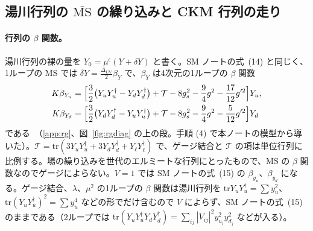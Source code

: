 \documentclass[a4paper,10pt]{ltjsarticle}
\newcommand{\MSbar}{\overline{\mathrm{MS}}}
\newcommand{\DUV}{\Delta_{\mathrm{UV}}}
\newcommand{\tr}{\mathrm{tr}}
\begin{document}
\subsection{湯川行列の $\MSbar$ の繰り込みと CKM 行列の走り}\label{sec:rg}

\paragraph{行列の $\beta$ 関数。}湯川行列の裸の量を $Y_0=\mu^\epsilon(Y+\delta Y)$ と書く。SM ノートの式~(14) と同じく、1ループの $\MSbar$ では $\delta Y=\frac{\DUV}2\beta_Y$ で、$\beta_Y$ は4次元の1ループの $\beta$ 関数
\begin{equation}
\begin{aligned}
K\beta_{Y_u}&=\Bigl[\frac32\bigl(Y_uY_u^\dagger-Y_dY_d^\dagger\bigr)+\mathcal T-8g_s^2-\frac94g^2-\frac{17}{12}g'^2\Bigr]Y_u,\\
K\beta_{Y_d}&=\Bigl[\frac32\bigl(Y_dY_d^\dagger-Y_uY_u^\dagger\bigr)+\mathcal T-8g_s^2-\frac94g^2-\frac5{12}g'^2\Bigr]Y_d
\end{aligned}
\label{eq:betaY}
\end{equation}
である~\cite{mv2,arason92}（\ref{app:rg}、図~\ref{fig:rgdiag} の上の段。手順 (4) で本ノートの模型から導いた）。$\mathcal T=\tr(3Y_uY_u^\dagger+3Y_dY_d^\dagger+Y_\ell Y_\ell^\dagger)$ で、ゲージ結合と $\mathcal T$ の項は単位行列に比例する。場の繰り込みを世代のエルミートな行列にとったもので、$\MSbar$ の $\beta$ 関数なのでゲージによらない。$V=1$ では SM ノートの式~(15) の $\beta_{y_u}$、$\beta_{y_d}$ になる。ゲージ結合、$\lambda$、$\mu^2$ の1ループの $\beta$ 関数は湯川行列を $\tr Y_uY_u^\dagger=\sum y_u^2$、$\tr(Y_uY_u^\dagger)^2=\sum y_u^4$ などの形でだけ含むので $V$ によらず、SM ノートの式~(15) のままである（2ループでは $\tr(Y_uY_u^\dagger Y_dY_d^\dagger)=\sum_{ij}|V_{ij}|^2y_{u_i}^2y_{d_j}^2$ などが入る）。
\end{document}
